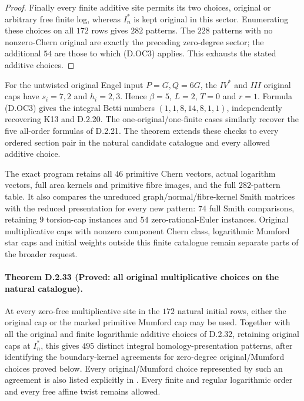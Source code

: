 \begin{proof}
Finally every finite additive site permits its two choices,
original or arbitrary free finite log, whereas $I_n^*$ is
kept original in this sector. Enumerating these choices
on all $172$ rows gives $282$ patterns. The $228$ patterns
with no nonzero-Chern original are exactly the preceding
zero-degree sector; the additional $54$ are those to which
(D.OC3) applies. This exhausts the stated additive choices.
\end{proof}

For the untwisted original Engel input $P=G,Q=6G$, the
$IV^*$ and $III$ original caps have $s_i=7,2$ and
$h_i=2,3$. Hence $\beta=5$, $L=2$, $T=0$ and $r=1$.
Formula (D.OC3) gives the integral Betti numbers
$(1,1,8,14,8,1,1)$, independently recovering K13 and
D.2.20. The one-original/one-finite cases similarly recover
the five all-order formulas of D.2.21. The theorem extends
these checks to every ordered section pair in the natural
candidate catalogue and every allowed additive choice.

The exact program 
retains all $46$ primitive Chern vectors, actual logarithm
vectors, full area kernels and primitive fibre images,
and the full $282$-pattern table. It also compares the
unreduced graph/normal/fibre-kernel Smith matrices with
the reduced presentation for every new pattern: $74$ full
Smith comparisons, retaining $9$ torsion-cap instances and
$54$ zero-rational-Euler instances. Original multiplicative caps with nonzero
component Chern class, logarithmic Mumford star caps and
initial weights outside this finite catalogue remain
separate parts of the broader request.


\paragraph{Theorem D.2.33 (Proved: all original multiplicative choices on the natural catalogue).}
At every zero-free multiplicative site in the $172$ natural
initial rows, either the original cap or the marked primitive
Mumford cap may be used. Together with all the original and
finite logarithmic additive choices of D.2.32, retaining
original caps at $I_n^*$, this gives $495$ distinct integral homology-presentation
patterns, after identifying the boundary-kernel agreements
for zero-degree original/Mumford choices proved below.
Every original/Mumford choice represented by such an
agreement is also listed explicitly in
.
Every finite and regular logarithmic order and every free
affine twist remains allowed.

